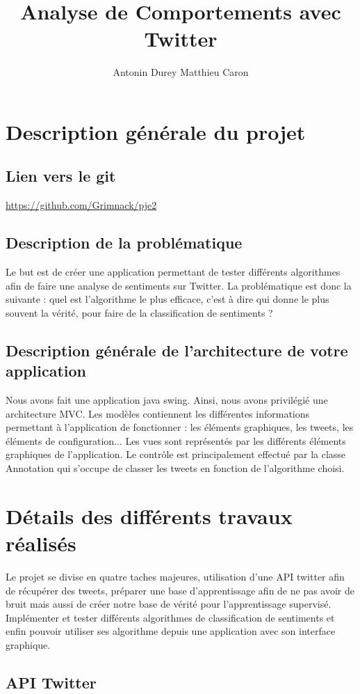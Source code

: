 \documentclass[a4paper,10pt]{report}
\title{Analyse de Comportements avec Twitter}
\author{Antonin Durey Matthieu Caron}
\begin{document}
\maketitle
\chapter{Description générale du projet}
  \section{Lien vers le git}
    \url{https://github.com/Grimnack/pje2}
  \section{Description de la problématique}
    Le but est de créer une application permettant de tester différents algorithmes
    afin de faire une analyse de sentiments sur Twitter. La problématique est donc la suivante :
    quel est l'algorithme le plus efficace, c'est à dire qui donne le plus souvent la vérité, pour faire de la 
    classification de sentiments ?
  \section{Description générale de l'architecture de votre application}
    Nous avons fait une application java swing. Ainsi, nous avons privilégié une architecture MVC.
    Les modèles contiennent les différentes informations permettant à l'application de fonctionner : les éléments graphiques, les tweets, les éléments de configuration...
    Les vues sont représentés par les différents éléments graphiques de l'application.
    Le contrôle est principalement effectué par la classe Annotation qui s'occupe de classer les tweets en fonction de l'algorithme choisi. 
\chapter{Détails des différents travaux réalisés}
  Le projet se divise en quatre taches majeures, utilisation d'une API twitter afin de récupérer 
  des tweets, préparer une base d'apprentissage afin de ne pas avoir de bruit mais aussi de créer notre 
  base de vérité pour l'apprentissage supervisé. Implémenter et tester différents algorithmes de classification de sentiments et
  enfin pouvoir utiliser ses algorithme depuis une application avec son interface graphique.
  \section{API Twitter}
\end{document}
